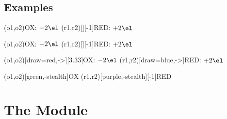 \documentclass{chemmacros-manual}
\begin{document}
\subsection{Examples}
\begin{example}
  \vspace{7mm}
  \redox(o1,o2){\small OX: $- 2\el$}
  \redox(r1,r2)[][-1]{\small RED: $+ 2\el$}
  \vspace{7mm}
\end{example}

\begin{example}
  \vspace{7mm}
  \redox(o1,o2){\small OX: $- 2\el$}
  \redox(r1,r2)[][-1]{\small RED: $+ 2\el$}
  \vspace{7mm}
\end{example}

\begin{example}
  \vspace{14mm}
  \redox(o1,o2)[draw=red,->][3.33]{\small OX: $- 2\el$}
  \redox(r1,r2)[draw=blue,->]{\small RED: $+ 2\el$}
\end{example}

\begin{example}
  \vspace{7mm}
  \redox(o1,o2)[green,-stealth]{\small OX}
  \redox(r1,r2)[purple,-stealth][-1]{\small RED}
  \vspace{7mm}
\end{example}

\section{The  Module}\label{sec:scheme-module}
\end{document}
